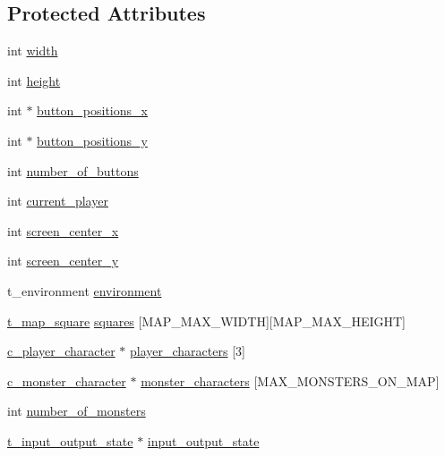 \subsection*{Protected Attributes}
\begin{DoxyCompactItemize}
\item 
int \hyperlink{classc__map_a24f23160d66e61d5f6943cd4f51aa06f}{width}
\item 
int \hyperlink{classc__map_af30ddc07f94cbc2e9c91cbdfd3f68cc5}{height}
\item 
int $\ast$ \hyperlink{classc__map_a4d9edbbf1f0e9465f7e04307af02afab}{button\-\_\-positions\-\_\-x}
\item 
int $\ast$ \hyperlink{classc__map_a6be0ac983d8dfd2aa801face76908dff}{button\-\_\-positions\-\_\-y}
\item 
int \hyperlink{classc__map_af36d349e1b651e72551f361b88cb9a76}{number\-\_\-of\-\_\-buttons}
\item 
int \hyperlink{classc__map_aee9ff4ca6cc941590f843b7c88b50067}{current\-\_\-player}
\item 
int \hyperlink{classc__map_a1fb9429d0318c721540dbe6337615cff}{screen\-\_\-center\-\_\-x}
\item 
int \hyperlink{classc__map_a060e812813124210995493d10bc873d0}{screen\-\_\-center\-\_\-y}
\item 
t\-\_\-environment \hyperlink{classc__map_a7717281184aa1c3eca2d1b2377a16d9d}{environment}
\item 
\hyperlink{structt__map__square}{t\-\_\-map\-\_\-square} \hyperlink{classc__map_ad2884dc5a43ee568bad98b47f8eebef5}{squares} \mbox{[}M\-A\-P\-\_\-\-M\-A\-X\-\_\-\-W\-I\-D\-T\-H\mbox{]}\mbox{[}M\-A\-P\-\_\-\-M\-A\-X\-\_\-\-H\-E\-I\-G\-H\-T\mbox{]}
\item 
\hyperlink{classc__player__character}{c\-\_\-player\-\_\-character} $\ast$ \hyperlink{classc__map_a54131ed05249666c5ba32558a1df7d3e}{player\-\_\-characters} \mbox{[}3\mbox{]}
\item 
\hyperlink{classc__monster__character}{c\-\_\-monster\-\_\-character} $\ast$ \hyperlink{classc__map_af0168711e28d3671a9ef69003f3f0dc6}{monster\-\_\-characters} \mbox{[}M\-A\-X\-\_\-\-M\-O\-N\-S\-T\-E\-R\-S\-\_\-\-O\-N\-\_\-\-M\-A\-P\mbox{]}
\item 
int \hyperlink{classc__map_aab102e2ce55754d739b6679740f97a7c}{number\-\_\-of\-\_\-monsters}
\item 
\hyperlink{structt__input__output__state}{t\-\_\-input\-\_\-output\-\_\-state} $\ast$ \hyperlink{classc__map_a548cfcecd3a9981dc3c4dd950ceaeab4}{input\-\_\-output\-\_\-state}

\end{DoxyCompactItemize}
